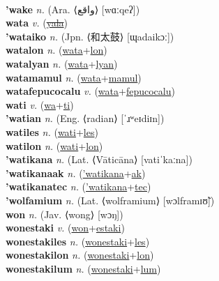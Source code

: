  \label{'wacintontisi} \\
\textbf{'wake} \textit{n.} (Ara. ⟨واقع‎⟩ [wɑːqeʔ])
 \label{'wake} \\
\textbf{wata} \textit{v.} (\hyperref[yala]{\sout{yala}})
 \label{wata} \\
\textbf{'wataiko} \textit{n.} (Jpn. ⟨和太鼓⟩ [ɰadaikɔː])
 \label{'wataiko} \\
\textbf{watalon} \textit{n.} (\hyperref[wata]{wata}+\hyperref[lon]{lon})
 \label{watalon} \\
\textbf{watalyan} \textit{n.} (\hyperref[wata]{wata}+\hyperref[lyan]{lyan})
 \label{watalyan} \\
\textbf{watamamul} \textit{n.} (\hyperref[wata]{wata}+\hyperref[mamul]{mamul})
 \label{watamamul} \\
\textbf{watafepucocalu} \textit{v.} (\hyperref[wata]{wata}+\hyperref[fepucocalu]{fepucocalu})
 \label{watafepucocalu} \\
\textbf{wati} \textit{v.} (\hyperref[wa]{wa}+\hyperref[ti]{ti})
 \label{wati} \\
\textbf{'watian} \textit{n.} (Eng. ⟨radian⟩ [ˈɹʷeɪdiɪn])
 \label{'watian} \\
\textbf{watiles} \textit{n.} (\hyperref[wati]{wati}+\hyperref[les]{les})
 \label{watiles} \\
\textbf{watilon} \textit{n.} (\hyperref[wati]{wati}+\hyperref[lon]{lon})
 \label{watilon} \\
\textbf{'watikana} \textit{n.} (Lat. ⟨Vāticāna⟩ [vatiˈkaːna])
 \label{'watikana} \\
\textbf{'watikanaak} \textit{n.} (\hyperref['watikana]{'watikana}+\hyperref[ak]{ak})
 \label{'watikanaak} \\
\textbf{'watikanatec} \textit{n.} (\hyperref['watikana]{'watikana}+\hyperref[tec]{tec})
 \label{'watikanatec} \\
\textbf{'wolfamium} \textit{n.} (Lat. ⟨wolframium⟩ [wɔlframɪʊ̃])
 \label{'wolfamium} \\
\textbf{won} \textit{n.} (Jav. ⟨wong⟩ [wɔŋ])
 \label{won} \\
\textbf{wonestaki} \textit{v.} (\hyperref[won]{won}+\hyperref[estaki]{estaki})
 \label{wonestaki} \\
\textbf{wonestakiles} \textit{n.} (\hyperref[wonestaki]{wonestaki}+\hyperref[les]{les})
 \label{wonestakiles} \\
\textbf{wonestakilon} \textit{n.} (\hyperref[wonestaki]{wonestaki}+\hyperref[lon]{lon})
 \label{wonestakilon} \\
\textbf{wonestakilum} \textit{n.} (\hyperref[wonestaki]{wonestaki}+\hyperref[lum]{lum})
